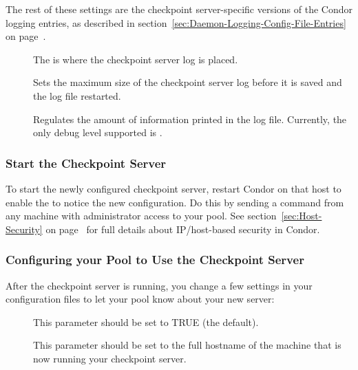 The rest of these settings are the checkpoint server-specific versions
of the Condor logging entries, as described in
section~\ref{sec:Daemon-Logging-Config-File-Entries} on
page~\pageref{sec:Daemon-Logging-Config-File-Entries}.
\begin{description}

\item[] The  is where the
checkpoint server log is placed.

\item[] Sets the maximum
size of the checkpoint server log before it is saved and the
log file restarted.

\item[] Regulates
the amount of information
printed in the log file.
Currently, the only debug level supported is .

\end{description}

\subsubsection{\label{Start-Ckpt-Server} Start the Checkpoint Server} 

To start the newly configured checkpoint server,
restart Condor on that host to enable
the  to notice the new configuration.
Do this by sending a  command from any machine
with administrator access to your pool.
See section~\ref{sec:Host-Security} on
page~\pageref{sec:Host-Security} for full details about IP/host-based
security in Condor.

\subsubsection{\label{Configure-Pool-Ckpt-Server} 
Configuring your Pool to Use the Checkpoint Server}

After the checkpoint server is running, you
change a few settings in your configuration files to let your pool know
about your new server:

\begin{description}
   \item[] This parameter should be set to
   TRUE (the default).

   \item[] This parameter should be set to
   the full hostname of the machine that is now running your checkpoint
   server.  
\end{description}


